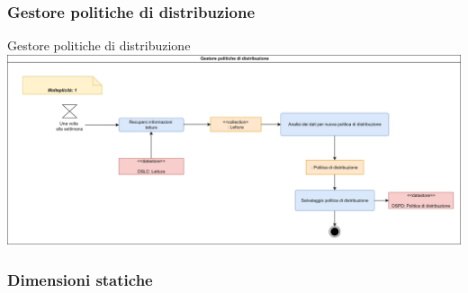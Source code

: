 \documentclass{beamer}
\begin{document}
	\begin{frame}
		\subsubsection{Gestore politiche di distribuzione}	
		\begin{block}{Gestore politiche di distribuzione}
			\includegraphics[width=\textwidth, height=0.85\textheight, keepaspectratio=true]{comp4.png}
		\end{block}
	\end{frame}	
	
	\subsubsection{Dimensioni statiche}
	
\end{document}
